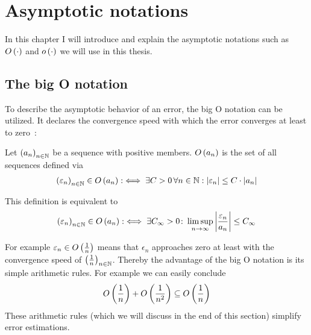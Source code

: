 \chapter{Asymptotic notations} \label{chapter:tools}

In this chapter I will introduce and explain the asymptotic notations such as $O\left( {\cdot} \right)$ and $o\left( {\cdot} \right)$ we will use in this thesis.

\section{The big O notation}

To describe the asymptotic behavior of an error, the big O notation can be utilized. It declares the convergence speed with which the error converges at least to zero~\cite[p. 444]{graham}\cite[p.~100]{aigner}:

\begin{definition}
  Let $\left({a_n}\right)_{{n}\in\mathbb N}$ be a sequence with positive members. $O\left( {a_n} \right)$ is the set of all sequences defined via
  \begin{align} \label{bigo_def1}
    \left({\varepsilon_n}\right)_{{n}\in\mathbb N} \in O\left( {a_n} \right) :\iff \exists C > 0\, \forall n\in \mathbb N: \left|{\varepsilon_n}\right| \le C \cdot \left|{a_n}\right|
  \end{align}
\end{definition}

\noindent This definition is equivalent to~\cite[p.~383]{hachenberger}\cite{wiki:bigo}
\begin{align} \label{bigo_def_limsup}
  \left({\varepsilon_n}\right)_{{n}\in\mathbb N} \in O\left( {a_n} \right) :\iff \exists C_\infty > 0 \colon\limsup_{n\to\infty} \left|{\frac{\varepsilon_n}{a_n}}\right| \le C_\infty
\end{align}

For example $\varepsilon_n \in O\left( {\frac 1n} \right)$ means that $\epsilon_n$ approaches zero at least with the convergence speed of $\left({\frac 1n}\right)_{{n}\in\mathbb N}$. Thereby the advantage of the big O notation is its simple arithmetic rules. For example we can easily conclude
\begin{align}
  O\left( {\frac 1n} \right) + O\left( {\frac 1{n^2}} \right) \subseteq O\left( {\frac 1n} \right)
\end{align}
These arithmetic rules (which we will discuss in the end of this section) simplify error estimations.

